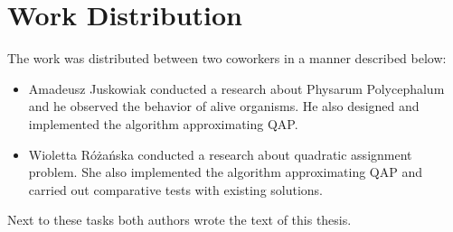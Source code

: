 \section*{Work Distribution}
\label{section:introduction_distribution}

The work was distributed between two coworkers in a manner described below:
\begin{itemize}
  \item Amadeusz Juskowiak conducted a research about Physarum Polycephalum and he observed the behavior of alive organisms. He also designed and implemented the algorithm approximating QAP.
  \item Wioletta Różańska conducted a research about quadratic assignment problem. She also implemented the algorithm approximating QAP and carried out comparative tests with existing solutions.
\end{itemize}

Next to these tasks both authors wrote the text of this thesis.
